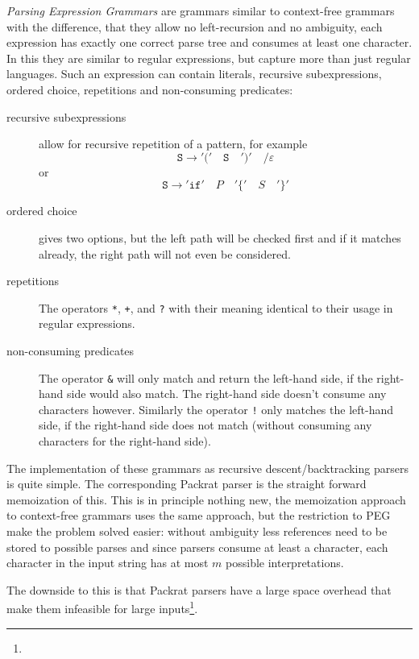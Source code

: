 \documentclass[11pt,a4paper,twoside,openright]{Thesis}
\theoremstyle{definition}
\begin{document}
\emph{Parsing Expression Grammars} are grammars similar to context-free
grammars with the difference, that they allow no left-recursion and no
ambiguity, each expression has exactly one correct parse tree and consumes at
least one character. In this they are similar to regular expressions, but
capture more than just regular languages.  Such an expression can contain
literals, recursive subexpressions, ordered choice, repetitions and
non-consuming predicates:

\begin{description}
  \item[recursive subexpressions] allow for recursive repetition of a
    pattern, for example
    \[\mathtt{S} \rightarrow \mathtt{'('}\quad \mathtt{S}\quad \mathtt{')'}\quad \mathtt{/} \varepsilon \]
    or
    \[ \mathtt{S} \rightarrow \mathtt{'if'}\quad P\quad \mathtt{'\{'}\quad S\quad \mathtt{'\}'}\]
  \item[ordered choice] gives two options, but the left path will be checked
    first and if it matches already, the right path will not even be considered.
  \item[repetitions] The operators \texttt{*}, \texttt{+}, and \texttt{?}
    with their meaning identical to their usage in regular expressions.
  \item[non-consuming predicates] The operator \texttt{\&} will only match and
    return the left-hand side, if the right-hand side would also match. The
    right-hand side doesn't consume any characters however. Similarly the
    operator \texttt{!} only matches the left-hand side, if the right-hand
    side does not match (without consuming any characters for the right-hand side).
\end{description}

The implementation of these grammars as recursive descent/backtracking
parsers is quite simple. The corresponding Packrat parser is the straight
forward memoization of this. This is in principle nothing new, the
memoization approach to context-free grammars uses the same approach, but the
restriction to PEG make the problem solved easier: without ambiguity less
references need to be stored to possible parses and since parsers consume at
least a character, each character in the input string has at most $m$
possible interpretations.

The downside to this is that Packrat parsers have a large space overhead that
make them infeasible for large
inputs\cite{Beck08a}\footnote{}.
\end{document}
